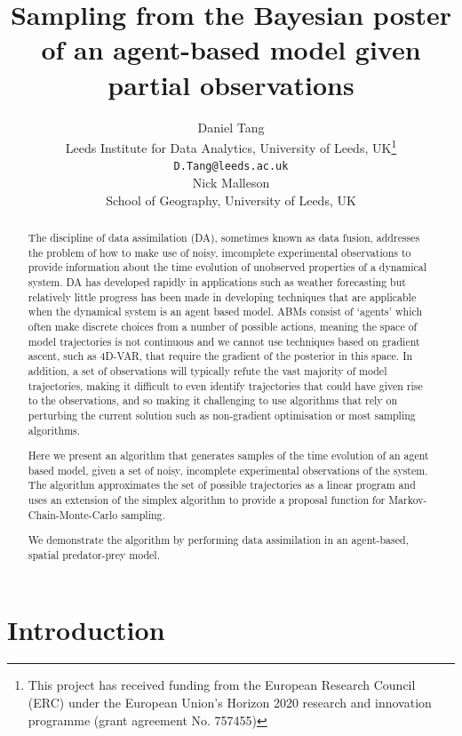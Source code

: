 \documentclass{article}
\title{Sampling from the Bayesian poster of an agent-based model given partial observations}
\author{
  Daniel Tang\\
    Leeds Institute for Data Analytics, University of Leeds, UK\thanks{This project has received funding from the European Research Council (ERC) under the European Union’s Horizon 2020 research and innovation programme (grant agreement No. 757455)}\\
  \texttt{D.Tang@leeds.ac.uk}\\
  \AND
  Nick Malleson\\
  School of Geography, University of Leeds, UK\\  
}
\begin{document}
\maketitle

\begin{abstract}
The discipline of data assimilation (DA), sometimes known as data fusion, addresses the problem of how to make use of noisy, imcomplete experimental observations to provide information about the time evolution of unobserved properties of a dynamical system. DA has developed rapidly in applications such as weather forecasting but relatively little progress has been made in developing techniques that are applicable when the dynamical system is an agent based model. ABMs consist of `agents' which often make discrete choices from a number of possible actions, meaning the space of model trajectories is not continuous and we cannot use techniques based on gradient ascent, such as 4D-VAR, that require the gradient of the posterior in this space. In addition, a set of observations will typically refute the vast majority of model trajectories, making it difficult to even identify trajectories that could have given rise to the observations, and so making it challenging to use algorithms that rely on perturbing the current solution such as non-gradient optimisation or most sampling algorithms.

Here we present an algorithm that generates samples of the time evolution of an agent based model, given a set of noisy, incomplete experimental observations of the system. The algorithm approximates the set of possible trajectories as a linear program and uses an extension of the simplex algorithm to provide a proposal function for Markov-Chain-Monte-Carlo sampling.

We demonstrate the algorithm by performing data assimilation in an agent-based, spatial predator-prey model.
\end{abstract}


\section{Introduction}

\end{document}
